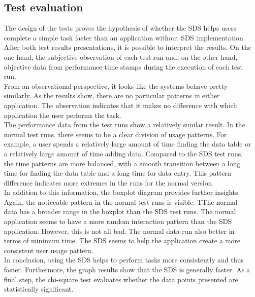 \subsection{Test evaluation}
The design of the tests proves the hypothesis of whether the SDS helps users complete a simple task faster than an application without \ac{SDS} implementation. After both test results presentations, it is possible to interpret the results. On the one hand, the subjective observation of each test run and, on the other hand, objective data from performance time stamps during the execution of each test run.  \\
From an observational perspective, it looks like the systems behave pretty similarly. As the results show, there are no particular patterns in either application. The observation indicates that it makes no difference with which application the user performs the task.  \\
The performance data from the test runs show a relatively similar result. In the normal test runs, there seems to be a clear division of usage patterns. For example, a user spends a relatively large amount of time finding the data table or a relatively large amount of time adding data. Compared to the \ac{SDS} test runs, the time patterns are more balanced, with a smooth transition between a long time for finding the data table and a long time for data entry. This pattern difference indicates more extremes in the runs for the normal version.  \\
In addition to this information, the boxplot diagram provides further insights. Again, the noticeable pattern in the normal test runs is visible. TThe normal data has a broader range in the boxplot than the \ac{SDS} test runs. The normal application seems to have a more random interaction pattern than the \ac{SDS} application. However, this is not all bad. The normal data run also better in terms of minimum time. The \ac{SDS} seems to help the application create a more consistent user usage pattern.  \\
In conclusion, using the \ac{SDS} helps to perform tasks more consistently and thus faster. Furthermore, the graph results show that the \ac{SDS} is generally faster. As a final step, the chi-square test evaluates whether the data points presented are statistically significant. \\

